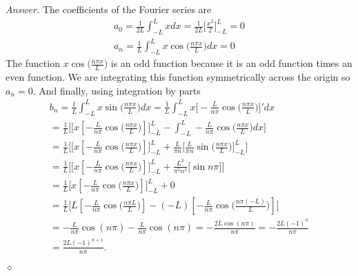 \documentclass[12pt,oneside]{amsart}
\theoremstyle{definition}
\theoremstyle{remark}
\numberwithin{equation}{exer}
\newenvironment{answer}{\bigskip\noindent\emph{Answer.}}{\hfill$\diamond$\newline}
\begin{document}
\begin{answer}
The coefficients of the Fourier series are
\begin{align*}
    a_0 = \frac{1}{2L} \int_{-L}^{L}x dx = \frac{1}{2L}\Bigg[\frac{x^2}{2}\Bigg]_{-L}^{L} = 0\\
    a_n = \frac{1}{L} \int_{-L}^{L} x \cos\Big(\frac{n \pi x}{L}\Big)dx = 0
\end{align*}
The function $ x \cos\Big(\frac{n \pi x}{L}\Big)$ is an odd function because it is an odd function times an even function. We are integrating this function symmetrically across the origin so $a_n = 0$. And finally, using integration by parts
\begin{align*}
    b_n = \frac{1}{L}\int_{-L}^{L} x \sin\Big( \frac {n \pi x}{L} \Big) dx = \frac{1}{L} \int_{-L}^{L} x \Big[-\frac{L}{n \pi} \cos\Big(\frac{n \pi x}{L} \Big)\Big]'dx\\
    = \frac{1}{L} \Bigg[ \Big[ x [-\frac{L}{n \pi} \cos\Big(\frac{n \pi x}{L} \Big)]\Big]_{-L}^{L} - \int_{-L}^{L} -\frac{L}{n \pi} \cos\Big(\frac{n \pi x}{L} \Big)dx \Bigg]\\
     = \frac{1}{L} \Bigg[ \Big[ x [-\frac{L}{n \pi} \cos\Big(\frac{n \pi x}{L} \Big)]\Big]_{-L}^{L} + \frac{L}{\pi n}\Big[\frac{L}{\pi n}\sin\Big(\frac{n \pi x}{L}\Big) \Big]_{-L}^{L}\Bigg] \\
     = \frac{1}{L} \Bigg[\Big[ x [-\frac{L}{n \pi} \cos\Big(\frac{n \pi x}{L} \Big)]\Big]_{-L}^{L} + \frac{L^2}{\pi^2n^2}\Big[\sin{n \pi}\Big]\Bigg] \\
     = \frac{1}{L} \Big[ x [-\frac{L}{n \pi} \cos\Big(\frac{n \pi x}{L} \Big)]\Big]_{-L}^{L} + 0 \\
     =\frac{1}{L} \Big[ L [-\frac{L}{n \pi} \cos\Big(\frac{n \pi L}{L} \Big)]- (-L) [-\frac{L}{n \pi} \cos\Big(\frac{n \pi (-L)}{L} \Big)]\Big]\\
    =-\frac{L}{n \pi} \cos(n \pi ) -\frac{L}{n \pi} \cos(n \pi ) = -\frac{2L \cos(n \pi)}{n \pi} = -\frac{2L(-1)^n}{n \pi}\\ = \frac{2L(-1)^{n+1}}{n \pi}.
\end{align*}



\end{answer}
\end{document}
